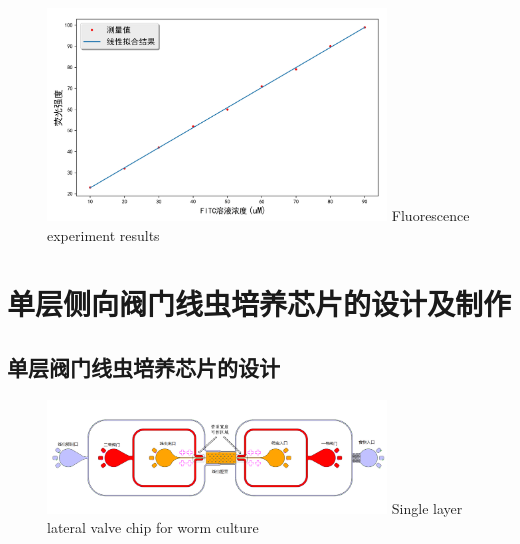 	\begin{figure}[htbp]
	  \centering
	  \includegraphics[width=9cm]{figure/chap2/fluence.jpg}
		{Fluorescence experiment results}
	  \label{fig:chap2:fluence}
	\end{figure}
\section{单层侧向阀门线虫培养芯片的设计及制作}
\subsection{单层阀门线虫培养芯片的设计}
\label{subsec:chipdesign}
	\begin{figure}[htbp]
	  \centering
	  \includegraphics[width=9cm]{figure/chap2/arch-chip.png}
		{Single layer lateral valve chip for  worm culture}
	  \label{fig:chap2:fluence}
	\end{figure}
